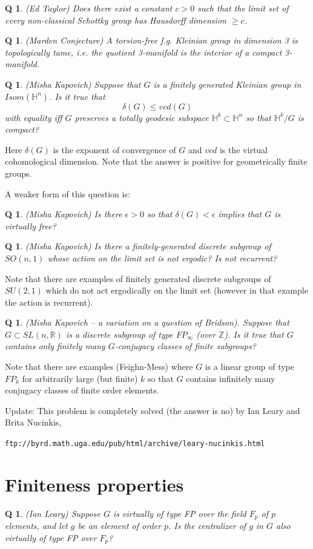 \documentclass[11pt]{article}
\newtheorem{q}[thm]{Q}
\theoremstyle{remark}
\def\b{\begin{q}}
\def\e{\end{q}}
\newcommand{\<}{\langle}
\renewcommand{\>}{\rangle}
\begin{document}
\b
(Ed Taylor) Does there exist a constant $c>0$ such that the limit set
of every non-classical Schottky group has Hausdorff dimension $\geq c$.\e

\b
(Marden Conjecture) A torsion-free f.g. Kleinian group in dimension 3
is topologically tame, i.e. the quotient 3-manifold is the interior of
a compact 3-manifold.\e

\b
(Misha Kapovich)
Suppose that $G$ is a finitely generated Kleinian group in 
$Isom({\mathbb H}^n)$. Is it true that
$$
\delta(G) \le vcd(G)
$$      
with equality iff $G$ preserves a totally geodesic subspace 
${\mathbb H}^k\subset  {\mathbb H}^n$ so that  ${\mathbb H}^k/G$ is compact? 
\e

Here $\delta(G)$ is the exponent of convergence of $G$ and $vcd$ is the
virtual 
cohomological dimension. Note that the answer is positive for geometrically 
finite groups. 

A weaker form of this question is: 

\b (Misha Kapovich)
Is there $\epsilon >0$ so that 
$\delta(G)<\epsilon$ implies that $G$ is virtually free? \e

\b (Misha Kapovich)
Is there a finitely-generated discrete subgroup of $SO(n,1)$ whose 
action on the limit set is not ergodic? Is not recurrent? 
\e
Note that 
there are examples of finitely generated discrete subgroups of $SU(2,1)$ 
which do not act ergodically on the limit set (however in that example the 
action is recurrent). 


\b (Misha Kapovich -- a variation on a question of Bridson). 
Suppose that $G\subset 
SL(n,{\mathbb R})$ is a discrete subgroup of type $FP_{\infty}$ (over 
${\mathbb Z}$). Is it true that $G$ contains only finitely many $G$-conjugacy
classes of finite subgroups? \e

Note that there are examples (Feighn-Mess) where $G$ is a linear group 
of type $FP_k$ for arbitrarily large (but finite) $k$ so that $G$ contains 
infinitely many conjugacy classes of finite order elements. 

Update: This problem is completely solved (the answer is no) by Ian
Leary and Brita Nucinkis,

{\tt ftp://byrd.math.uga.edu/pub/html/archive/leary-nucinkis.html}

\section{Finiteness properties}

\b (Ian Leary)
Suppose $G$ is virtually of type FP over the field $F_p$ of $p$ 
elements, and let $g$ be an element of order $p$.  Is the 
centralizer of $g$ in $G$ also virtually of type FP over $F_p$?  
\e
\end{document}
